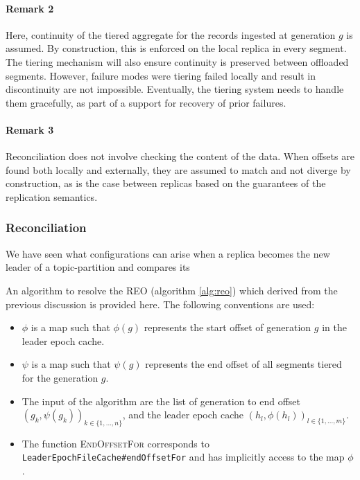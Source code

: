 \documentclass{article}
\begin{document}
\paragraph{Remark 2} Here, continuity of the tiered aggregate for the records ingested at generation $g$ is assumed. By construction, this is enforced on the local replica in every segment. The tiering mechanism will also ensure continuity is preserved between offloaded segments. However, failure modes were tiering failed locally and result in discontinuity are not impossible. Eventually, the tiering system needs to handle them gracefully, as part of a support for recovery of prior failures.

\paragraph{Remark 3} Reconciliation does not involve checking the content of the data. When offsets are found both locally and externally, they are assumed to match and not diverge by construction, as is the case between replicas based on the guarantees of the replication semantics.

\subsubsection{Reconciliation}

We have seen what configurations can arise when a replica becomes the new leader of a topic-partition and compares its 




An algorithm to resolve the REO (algorithm \ref{alg:reo}) which derived from the previous discussion is provided here. The following conventions are used:

\begin{itemize}
	\item $\phi$ is a map such that $\phi(g)$ represents the start offset of generation $g$ in the leader epoch cache.
	\item $\psi$ is a map such that $\psi(g)$ represents the end offset of all segments tiered for the generation $g$.
	\item The input of the algorithm are the list of generation to end offset $(g_k, \psi(g_k))_{k \in \{1,...,n\}}$, and the leader epoch cache $(h_l, \phi(h_l))_{l \in \{1,...,m\}}$.
	\item The function \textsc{EndOffsetFor} corresponds to \texttt{LeaderEpochFileCache\#endOffsetFor} and has implicitly access to the map $\phi$.
\end{itemize} 
\end{document}
